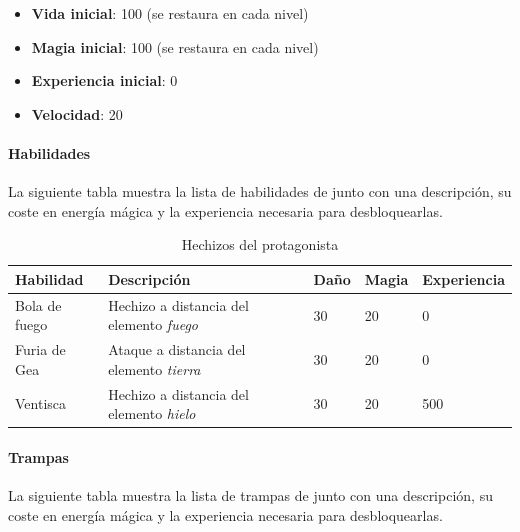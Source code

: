 
\begin{itemize}
    \item \textbf{Vida inicial}: 100 (se restaura en cada nivel)
    \item \textbf{Magia inicial}: 100 (se restaura en cada nivel)
    \item \textbf{Experiencia inicial}: 0
    \item \textbf{Velocidad}: 20
\end{itemize}

\paragraph{Habilidades}
La siguiente tabla muestra la lista de habilidades de \personaje junto
con una descripción, su coste en energía mágica y la experiencia necesaria
para desbloquearlas.

\begin{table}[H]
    \centering
        \begin{tabular}{| p{2.6cm} | p{7cm} | p{2cm} | p{2cm} | p{2cm} |}
            \hline
            \textbf{Habilidad} & \textbf{Descripción} & \textbf{Daño} & \textbf{Magia} & \textbf{Experiencia}\\
            \hline
            Bola de fuego & Hechizo a distancia del elemento \emph{fuego} & 30 & 20 & 0  \\
			\hline
            Furia de Gea & Ataque a distancia del elemento \emph{tierra} & 30 & 20 & 0  \\
			\hline
            Ventisca & Hechizo a distancia del elemento \emph{hielo} & 30 & 20 & 500  \\
			\hline
        \end{tabular}
    \caption{Hechizos del protagonista}
    \label{tab:hechizos}
\end{table}

\paragraph{Trampas}
La siguiente tabla muestra la lista de trampas de \personaje junto
con una descripción, su coste en energía mágica y la experiencia necesaria
para desbloquearlas.

